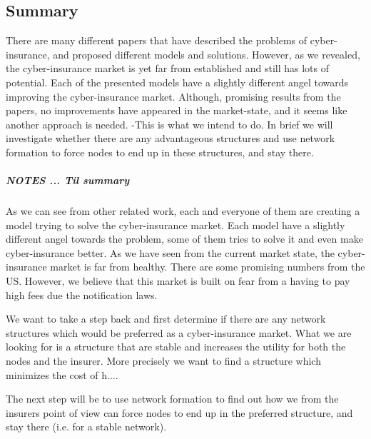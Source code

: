 \subsection{Summary}
There are many different papers that have described the problems of cyber-insurance, and proposed different models and solutions. However, as we revealed, the cyber-insurance market is yet far from established and still has lots of potential. Each of the presented models have a slightly different angel towards improving the cyber-insurance market. Although, promising results from the papers, no improvements have appeared in the market-state, and it seems like another approach is needed. -This is what we intend to do. In brief we will investigate whether there are any advantageous structures and use network formation to force nodes to end up in these structures, and stay there.

\subparagraph{NOTES ... Til summary}
As we can see from other related work, each and everyone of them are creating a model trying to solve the cyber-insurance market. Each model have a slightly different angel towards the problem, some of them tries to solve it and even make cyber-insurance better. As we have seen from the current market state, the cyber-insurance market is far from healthy. There are some promising numbers from the US. However, we believe that this market is built on fear from a having to pay high fees due the notification laws. 


We want to take a step back and first determine if there are any network structures which would be preferred as a cyber-insurance market. What we are looking for is a structure that are stable and increases the utility for both the nodes and the insurer. More precisely we want to find a structure which minimizes the cost of h....

The next step will be to use network formation to find out how we from the insurers point of view can force nodes to end up in the preferred structure, and stay there (i.e. for a stable network). 
